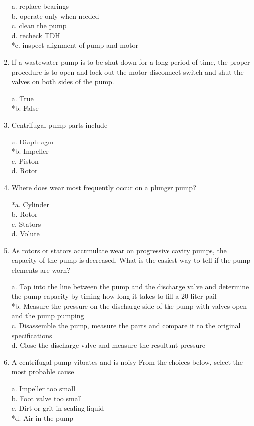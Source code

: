 \begin{enumerate}[1.]
a. replace bearings \\
b. operate only when needed \\
c. clean the pump \\
d. recheck TDH \\
*e. inspect alignment of pump and motor 


\item  If a wastewater pump is to be shut down for a long period of time, the proper procedure is to open and lock out the motor disconnect switch and shut the valves on both sides of the pump. 

a. True \\
*b. False 


\item  Centrifugal pump parts include 

a. Diaphragm \\
*b. Impeller \\
c. Piston \\
d. Rotor 


\item  Where does wear most frequently occur on a plunger pump? 

*a. Cylinder \\
b. Rotor \\
c. Stators \\
d. Volute

\item  As rotors or stators accumulate wear on progressive cavity pumps, the capacity of the pump is decreased. What is the easiest way to tell if the pump elements are worn? 

a. Tap into the line between the pump and the discharge valve and determine the pump capacity by timing how long it takes to fill a 20-liter pail \\
*b. Measure the pressure on the discharge side of the pump with valves open and the pump pumping \\
c. Disassemble the pump, measure the parts and compare it to the original specifications \\
d. Close the discharge valve and measure the resultant pressure 


\item  A centrifugal pump vibrates and is noisy From the choices below, select the most probable cause 

a. Impeller too small \\
b. Foot valve too small \\
c. Dirt or grit in sealing liquid \\
*d. Air in the pump 



\end{enumerate}
